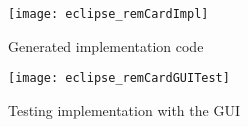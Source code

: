 \begin{itemize}
\newpage

\vspace*{1cm}

\begin{figure}[htp]
\begin{center}
  \texttt{[image: eclipse\_remCardImpl]}
  \caption{Generated implementation code}
  \label{fig:remCardImpl}
\end{center}
\end{figure}

\vspace*{2cm}

\begin{figure}[htp]
\begin{center}
  \texttt{[image: eclipse\_remCardGUITest]}
  \caption{Testing implementation with the GUI}
  \label{fig:GUITest}
\end{center}
\end{figure}


\end{itemize}
